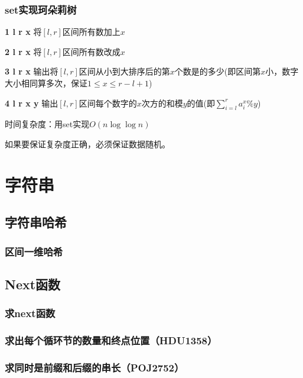\documentclass{article}
\begin{document}
\subsubsection{set实现珂朵莉树}
\textbf{1 l r x} 将$[l,r]$区间所有数加上$x$\par
\textbf{2 l r x} 将$[l,r]$区间所有数改成$x$\par
\textbf{3 l r x} 输出将$[l,r]$区间从小到大排序后的第$x$个数是的多少(即区间第$x$小，数字大小相同算多次，保证$1\leq x \leq r-l+1$)\par
\textbf{4 l r x y} 输出$[l,r]$区间每个数字的$x$次方的和模$y$的值(即$\sum ^ {r}_{i=l} a_i^x \% y$)\par
时间复杂度：用set实现$O(n\log \log {n})$\par
如果要保证复杂度正确，必须保证数据随机。\par

\section{字符串}

\subsection{字符串哈希}
\subsubsection{区间一维哈希}

% 



\subsection{Next函数}
\subsubsection{求next函数}

\subsubsection{求出每个循环节的数量和终点位置（HDU1358）}

\subsubsection{求同时是前缀和后缀的串长（POJ2752）}

\end{document}
